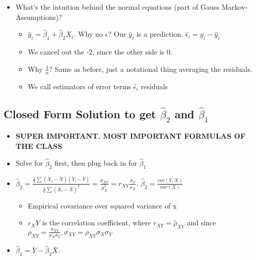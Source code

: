 \documentclass[10pt, oneside]{article}
\begin{document}
\begin{itemize}
\begin{itemize}
\begin{itemize}
\begin{itemize}
            \end{itemize}
        \end{itemize}
        \item What's the intuition behind the normal equations (part of Gauss Markov-Assumptions)?
        \begin{itemize}
            \item $\hat y_i = \hat \beta_1 + \hat \beta_2 X_i$. Why no $\epsilon$? Our $\hat y_i$ is a prediction. $\hat \epsilon_i = y_i - \hat y_i$
            \item We cancel out the -2, since the other side is 0.
            \item Why $\frac{1}{n}$? Same as before, just a notational thing averaging the residuals.
            \item We call estimators of error terms $\hat \epsilon_i$ residuals
        \end{itemize}
    \end{itemize}
\end{itemize}

\subsection{Closed Form Solution to get $\hat \beta_2$ and $\hat \beta_1$}
\begin{itemize}
    \item \textbf{SUPER IMPORTANT. MOST IMPORTANT FORMULAS OF THE CLASS}
    \item Solve for $\hat \beta_2$ first, then plug back in for $\hat \beta_1$
    \item $\hat \beta_2 = \frac{\frac{1}{n} \sum(X_i - \bar X) (Y_i - \bar Y)}{\frac{1}{n} \sum (X_i - \bar X)^2} = \frac{\hat \sigma_{XY}}{\hat \sigma^2 _X} = r_{XY} \frac{\hat \sigma_Y}{\hat \sigma_X}$. $\hat \beta_2 = \frac{cov(Y,X)}{var(X)}$
    \begin{itemize}
        \item Empirical covariance over squared variance of x
        \item $r_XY$ is the correlation coefficient, where $r_{XY}=\hat \rho_{XY}$ and since \\$\rho_{XY}=\frac{\sigma_{XY}}{\sigma_X \sigma_Y}, \sigma_{XY}=\rho_{XY}\sigma_X \sigma_Y$
    \end{itemize}
    \item $\hat \beta_1 = \bar Y - \hat \beta_2 \bar X$. 

\end{itemize}
\end{document}
